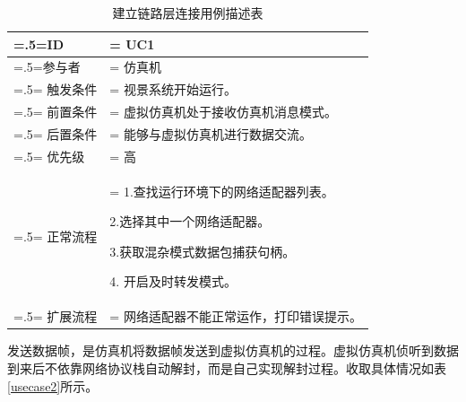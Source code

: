\begin{table}[htbp]
    \begin{center}
        \caption{建立链路层连接用例描述表}
        \label{usecase1}
        \renewcommand\arraystretch{1.5}
        \begin{tabularx}{0.8\textwidth}{ 
            | >{\centering\arraybackslash\hsize=.5\hsize\linewidth=\hsize}X 
            | >{\raggedright\arraybackslash\hsize=1.5\hsize\linewidth=\hsize}X 
            | }
            \hline
            \textbf{ID} & \textbf{UC1}\\
            \hline
            参与者 & 仿真机\\
            \hline
            触发条件 & 视景系统开始运行。\\
            \hline
            前置条件 & 虚拟仿真机处于接收仿真机消息模式。\\
            \hline
            后置条件 & 能够与虚拟仿真机进行数据交流。\\
            \hline
            优先级 & 高\\
            \hline
            正常流程 &  1.查找运行环境下的网络适配器列表。\par 2.选择其中一个网络适配器。\par 3.获取混杂模式数据包捕获句柄。\par 4. 开启及时转发模式。\\
            \hline
            扩展流程 & 网络适配器不能正常运作，打印错误提示。\\
            \hline
        \end{tabularx}
    \end{center}
\end{table}
\par
发送数据帧，是仿真机将数据帧发送到虚拟仿真机的过程。虚拟仿真机侦听到数据到来后不依靠网络协议栈自动解封，而是自己实现解封过程。收取具体情况如表\ref{usecase2}所示。
